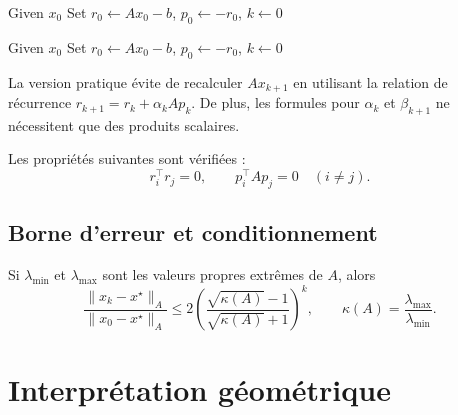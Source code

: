 \begin{algorithm}[H]
\caption{Version préliminaire du Gradient Conjugué}
\label{alg:cg-preliminary}
Given $x_0$\;
Set $r_0 \leftarrow Ax_0 - b$, $p_0 \leftarrow -r_0$, $k \leftarrow 0$\;
\end{algorithm}

\begin{algorithm}[H]
\caption{Gradient Conjugué (version pratique)}
\label{alg:cg-practical}
Given $x_0$\;
Set $r_0 \leftarrow Ax_0 - b$, $p_0 \leftarrow -r_0$, $k \leftarrow 0$\;
\end{algorithm}

\begin{remarque}
La version pratique évite de recalculer $Ax_{k+1}$ en utilisant la relation de récurrence $r_{k+1} = r_k + \alpha_k Ap_k$.
De plus, les formules pour $\alpha_k$ et $\beta_{k+1}$ ne nécessitent que des produits scalaires.
\end{remarque}

Les propriétés suivantes sont vérifiées :
\[
r_i^\top r_j = 0, \qquad p_i^\top A p_j = 0 \quad(i\neq j).
\]

\subsection{Borne d’erreur et conditionnement}

Si $\lambda_{\min}$ et $\lambda_{\max}$ sont les valeurs propres extrêmes de $A$, alors
\[
\frac{\|x_k - x^\star\|_A}{\|x_0 - x^\star\|_A}
\le
2\left(\frac{\sqrt{\kappa(A)} - 1}{\sqrt{\kappa(A)} + 1}\right)^k,
\qquad
\kappa(A)=\frac{\lambda_{\max}}{\lambda_{\min}}.
\]

\section{Interprétation géométrique}

